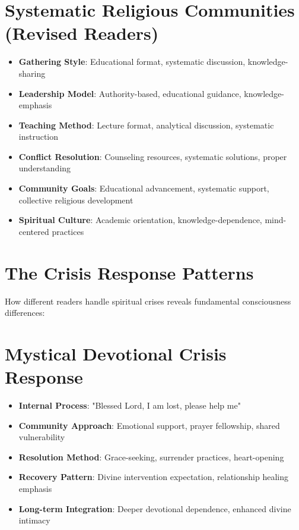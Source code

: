\documentclass[11pt,twoside]{book}
\begin{document}
\section*{Systematic Religious Communities (Revised Readers)}
\label{sec:orgf5d6e52}
\begin{itemize}
\item \textbf{\textbf{Gathering Style}}: Educational format, systematic discussion, knowledge-sharing
\item \textbf{\textbf{Leadership Model}}: Authority-based, educational guidance, knowledge-emphasis
\item \textbf{\textbf{Teaching Method}}: Lecture format, analytical discussion, systematic instruction
\item \textbf{\textbf{Conflict Resolution}}: Counseling resources, systematic solutions, proper understanding
\item \textbf{\textbf{Community Goals}}: Educational advancement, systematic support, collective religious development
\item \textbf{\textbf{Spiritual Culture}}: Academic orientation, knowledge-dependence, mind-centered practices
\end{itemize}
\section*{The Crisis Response Patterns}
\label{sec:org05f78c4}

How different readers handle spiritual crises reveals fundamental consciousness differences:
\section*{Mystical Devotional Crisis Response}
\label{sec:orge14b215}
\begin{itemize}
\item \textbf{\textbf{Internal Process}}: "Blessed Lord, I am lost, please help me"
\item \textbf{\textbf{Community Approach}}: Emotional support, prayer fellowship, shared vulnerability
\item \textbf{\textbf{Resolution Method}}: Grace-seeking, surrender practices, heart-opening
\item \textbf{\textbf{Recovery Pattern}}: Divine intervention expectation, relationship healing emphasis
\item \textbf{\textbf{Long-term Integration}}: Deeper devotional dependence, enhanced divine intimacy
\end{itemize}
\end{document}
